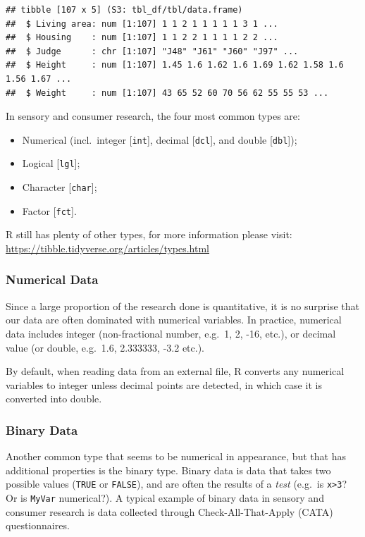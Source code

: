 \documentclass[
]{krantz}
\providecommand{\tightlist}{%
  \setlength{\itemsep}{0pt}\setlength{\parskip}{0pt}}
\begin{document}
\begin{verbatim}
## tibble [107 x 5] (S3: tbl_df/tbl/data.frame)
##  $ Living area: num [1:107] 1 1 2 1 1 1 1 1 3 1 ...
##  $ Housing    : num [1:107] 1 1 2 2 1 1 1 1 2 2 ...
##  $ Judge      : chr [1:107] "J48" "J61" "J60" "J97" ...
##  $ Height     : num [1:107] 1.45 1.6 1.62 1.6 1.69 1.62 1.58 1.6 1.56 1.67 ...
##  $ Weight     : num [1:107] 43 65 52 60 70 56 62 55 55 53 ...
\end{verbatim}

In sensory and consumer research, the four most common types are:

\begin{itemize}
\tightlist
\item
  Numerical (incl.~integer {[}\texttt{int}{]}, decimal {[}\texttt{dcl}{]}, and double {[}\texttt{dbl}{]});
\item
  Logical {[}\texttt{lgl}{]};
\item
  Character {[}\texttt{char}{]};
\item
  Factor {[}\texttt{fct}{]}.
\end{itemize}

R still has plenty of other types, for more information please visit: \url{https://tibble.tidyverse.org/articles/types.html}

\hypertarget{numerical-data}{%
\subsubsection{Numerical Data}\label{numerical-data}}

Since a large proportion of the research done is quantitative, it is no surprise that our data are often dominated with numerical variables. In practice, numerical data includes integer (non-fractional number, e.g.~1, 2, -16, etc.), or decimal value (or double, e.g.~1.6, 2.333333, -3.2 etc.).

By default, when reading data from an external file, R converts any numerical variables to integer unless decimal points are detected, in which case it is converted into double.

\hypertarget{binary-data}{%
\subsubsection{Binary Data}\label{binary-data}}

Another common type that seems to be numerical in appearance, but that has additional properties is the binary type.
Binary data is data that takes two possible values (\texttt{TRUE} or \texttt{FALSE}), and are often the results of a \emph{test} (e.g.~is \texttt{x\textgreater{}3}? Or is \texttt{MyVar} numerical?). A typical example of binary data in sensory and consumer research is data collected through Check-All-That-Apply (CATA) questionnaires.
\end{document}

